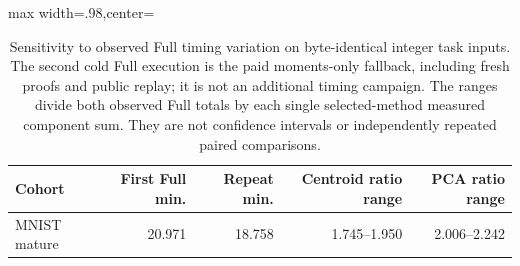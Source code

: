 \begin{table}[tbp]
\centering
\caption{Sensitivity to observed Full timing variation on byte-identical integer task inputs. The second cold Full execution is the paid moments-only fallback, including fresh proofs and public replay; it is not an additional timing campaign. The ranges divide both observed Full totals by each single selected-method measured component sum. They are not confidence intervals or independently repeated paired comparisons.}
\label{tab:full-repeat}
\begin{adjustbox}{max width=.98\textwidth,center=\textwidth}
\begin{tabular}{lrrrr}
\toprule
Cohort & First Full min. & Repeat min. & Centroid ratio range & PCA ratio range\\
\midrule
MNIST mature & 20.971 & 18.758 & 1.745--1.950 & 2.006--2.242\\
\bottomrule
\end{tabular}
\end{adjustbox}
\end{table}
